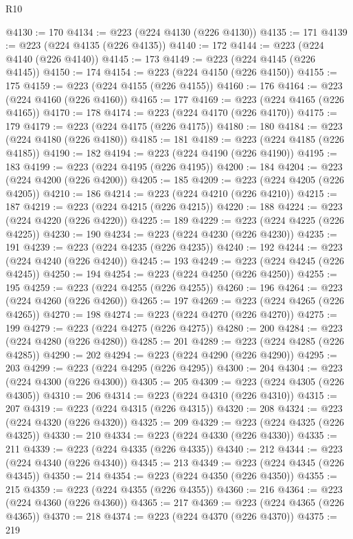 \begin{lexlean}{R10}
\begin{coremodule}
@4130 := 170
@4134 := @223 (@224 @4130 (@226 @4130))
@4135 := 171
@4139 := @223 (@224 @4135 (@226 @4135))
@4140 := 172
@4144 := @223 (@224 @4140 (@226 @4140))
@4145 := 173
@4149 := @223 (@224 @4145 (@226 @4145))
@4150 := 174
@4154 := @223 (@224 @4150 (@226 @4150))
@4155 := 175
@4159 := @223 (@224 @4155 (@226 @4155))
@4160 := 176
@4164 := @223 (@224 @4160 (@226 @4160))
@4165 := 177
@4169 := @223 (@224 @4165 (@226 @4165))
@4170 := 178
@4174 := @223 (@224 @4170 (@226 @4170))
@4175 := 179
@4179 := @223 (@224 @4175 (@226 @4175))
@4180 := 180
@4184 := @223 (@224 @4180 (@226 @4180))
@4185 := 181
@4189 := @223 (@224 @4185 (@226 @4185))
@4190 := 182
@4194 := @223 (@224 @4190 (@226 @4190))
@4195 := 183
@4199 := @223 (@224 @4195 (@226 @4195))
@4200 := 184
@4204 := @223 (@224 @4200 (@226 @4200))
@4205 := 185
@4209 := @223 (@224 @4205 (@226 @4205))
@4210 := 186
@4214 := @223 (@224 @4210 (@226 @4210))
@4215 := 187
@4219 := @223 (@224 @4215 (@226 @4215))
@4220 := 188
@4224 := @223 (@224 @4220 (@226 @4220))
@4225 := 189
@4229 := @223 (@224 @4225 (@226 @4225))
@4230 := 190
@4234 := @223 (@224 @4230 (@226 @4230))
@4235 := 191
@4239 := @223 (@224 @4235 (@226 @4235))
@4240 := 192
@4244 := @223 (@224 @4240 (@226 @4240))
@4245 := 193
@4249 := @223 (@224 @4245 (@226 @4245))
@4250 := 194
@4254 := @223 (@224 @4250 (@226 @4250))
@4255 := 195
@4259 := @223 (@224 @4255 (@226 @4255))
@4260 := 196
@4264 := @223 (@224 @4260 (@226 @4260))
@4265 := 197
@4269 := @223 (@224 @4265 (@226 @4265))
@4270 := 198
@4274 := @223 (@224 @4270 (@226 @4270))
@4275 := 199
@4279 := @223 (@224 @4275 (@226 @4275))
@4280 := 200
@4284 := @223 (@224 @4280 (@226 @4280))
@4285 := 201
@4289 := @223 (@224 @4285 (@226 @4285))
@4290 := 202
@4294 := @223 (@224 @4290 (@226 @4290))
@4295 := 203
@4299 := @223 (@224 @4295 (@226 @4295))
@4300 := 204
@4304 := @223 (@224 @4300 (@226 @4300))
@4305 := 205
@4309 := @223 (@224 @4305 (@226 @4305))
@4310 := 206
@4314 := @223 (@224 @4310 (@226 @4310))
@4315 := 207
@4319 := @223 (@224 @4315 (@226 @4315))
@4320 := 208
@4324 := @223 (@224 @4320 (@226 @4320))
@4325 := 209
@4329 := @223 (@224 @4325 (@226 @4325))
@4330 := 210
@4334 := @223 (@224 @4330 (@226 @4330))
@4335 := 211
@4339 := @223 (@224 @4335 (@226 @4335))
@4340 := 212
@4344 := @223 (@224 @4340 (@226 @4340))
@4345 := 213
@4349 := @223 (@224 @4345 (@226 @4345))
@4350 := 214
@4354 := @223 (@224 @4350 (@226 @4350))
@4355 := 215
@4359 := @223 (@224 @4355 (@226 @4355))
@4360 := 216
@4364 := @223 (@224 @4360 (@226 @4360))
@4365 := 217
@4369 := @223 (@224 @4365 (@226 @4365))
@4370 := 218
@4374 := @223 (@224 @4370 (@226 @4370))
@4375 := 219

\end{coremodule}
\end{lexlean}

